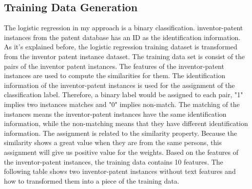 \subsection{Training Data Generation}
The logistic regression in my approach is a binary classification. inventor-patent instances from the patent database has an ID as the identification information. As it's explained before, the logistic regression training dataset is transformed from the inventor patent instance dataset. The training data set is consist of the pairs of the inventor patent instances. The features of the inventor-patent instances are used to compute the similarities for them. The identification information of the inventor-patent instances is used for the assignment of the classification label. Therefore, a binary label would be assigned to each pair, "1" implies two instances matches and "0" implies non-match. The matching of the instances means the inventor-patent instances have the same identification information, while the non-matching means that they have different identification information. The assignment is related to the similarity property. Because the similarity shows a great value when they are from the same persons, this assignment will give us positive value for the weights. Based on the features of the inventor-patent instances, the training data contains 10 features. The following table shows two inventor-patent instances without text features and how to transformed them into a piece of the training data.

